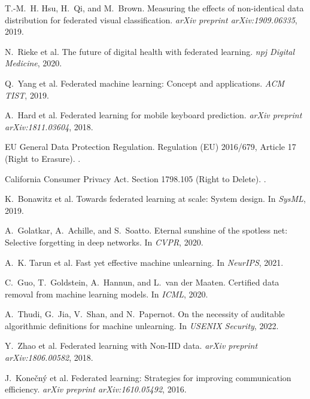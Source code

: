 \documentclass[10pt,twocolumn]{article}
\begin{document}
\begin{thebibliography}{99}
T.-M.~H. Hsu, H.~Qi, and M.~Brown.
\newblock Measuring the effects of non-identical data distribution for federated visual classification.
\newblock \textit{arXiv preprint arXiv:1909.06335}, 2019.

N.~Rieke et al.
\newblock The future of digital health with federated learning.
\newblock \textit{npj Digital Medicine}, 2020.

Q.~Yang et al.
\newblock Federated machine learning: Concept and applications.
\newblock \textit{ACM TIST}, 2019.

A.~Hard et al.
\newblock Federated learning for mobile keyboard prediction.
\newblock \textit{arXiv preprint arXiv:1811.03604}, 2018.

EU General Data Protection Regulation.
\newblock Regulation (EU) 2016/679, Article 17 (Right to Erasure).
.

California Consumer Privacy Act.
\newblock Section 1798.105 (Right to Delete).
.

K.~Bonawitz et al.
\newblock Towards federated learning at scale: System design.
\newblock In \textit{SysML}, 2019.

A.~Golatkar, A.~Achille, and S.~Soatto.
\newblock Eternal sunshine of the spotless net: Selective forgetting in deep networks.
\newblock In \textit{CVPR}, 2020.

A.~K. Tarun et al.
\newblock Fast yet effective machine unlearning.
\newblock In \textit{NeurIPS}, 2021.

C.~Guo, T.~Goldstein, A.~Hannun, and L.~van der Maaten.
\newblock Certified data removal from machine learning models.
\newblock In \textit{ICML}, 2020.

A.~Thudi, G.~Jia, V.~Shan, and N.~Papernot.
\newblock On the necessity of auditable algorithmic definitions for machine unlearning.
\newblock In \textit{USENIX Security}, 2022.

Y.~Zhao et al.
\newblock Federated learning with Non-IID data.
\newblock \textit{arXiv preprint arXiv:1806.00582}, 2018.

J.~Konečný et al.
\newblock Federated learning: Strategies for improving communication efficiency.
\newblock \textit{arXiv preprint arXiv:1610.05492}, 2016.


\end{thebibliography}
\end{document}
